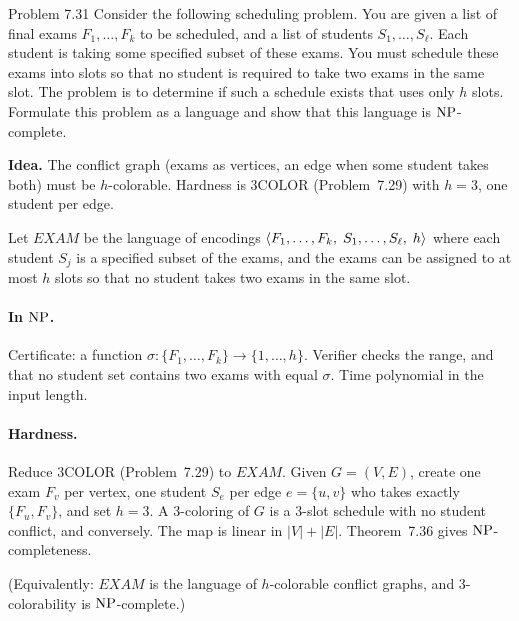 \begin{question}{Problem 7.31}
Consider the following scheduling problem. You are given a list of final exams $F_1,\dots,F_k$ to be scheduled, and a list of students $S_1,\dots,S_\ell$. Each student is taking some specified subset of these exams. You must schedule these exams into slots so that no student is required to take two exams in the same slot. The problem is to determine if such a schedule exists that uses only $h$ slots. Formulate this problem as a language and show that this language is $\mathrm{NP}$-complete.
\end{question}
\begin{soln}
\textbf{Idea.} The conflict graph (exams as vertices, an edge when some student takes both) must be $h$-colorable. Hardness is $3\mathrm{COLOR}$ (Problem~7.29) with $h=3$, one student per edge.

Let $\mathit{EXAM}$ be the language of encodings $\langle F_1,\dots,F_k,\; S_1,\dots,S_\ell,\; h\rangle$ where each student $S_j$ is a specified subset of the exams, and the exams can be assigned to at most $h$ slots so that no student takes two exams in the same slot.

\paragraph{In $\mathrm{NP}$.}
Certificate: a function $\sigma\colon\{F_1,\dots,F_k\}\to\{1,\dots,h\}$. Verifier checks the range, and that no student set contains two exams with equal $\sigma$. Time polynomial in the input length.

\paragraph{Hardness.}
Reduce $3\mathrm{COLOR}$ (Problem~7.29) to $\mathit{EXAM}$. Given $G=(V,E)$, create one exam $F_v$ per vertex, one student $S_e$ per edge $e=\{u,v\}$ who takes exactly $\{F_u,F_v\}$, and set $h=3$. A $3$-coloring of $G$ is a $3$-slot schedule with no student conflict, and conversely. The map is linear in $|V|+|E|$. Theorem~7.36 gives $\mathrm{NP}$-completeness.

(Equivalently: $\mathit{EXAM}$ is the language of $h$-colorable conflict graphs, and $3$-colorability is $\mathrm{NP}$-complete.)
\end{soln}


